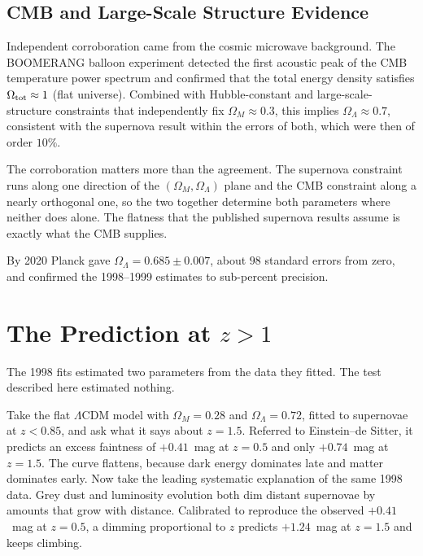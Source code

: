 \documentclass[12pt]{article}
\begin{document}
\subsection{CMB and Large-Scale Structure Evidence}

Independent corroboration came from the cosmic microwave background.
The BOOMERANG balloon experiment \citeyearpar{Boomerang2000} detected
the first acoustic peak of the CMB temperature power spectrum and
confirmed that the total energy density satisfies $\Omega_{\rm tot}
\approx 1$ (flat universe).  Combined with Hubble-constant and
large-scale-structure constraints that independently fix $\Omega_M \approx
0.3$, this implies $\Omega_\Lambda \approx 0.7$, consistent with the supernova
result within the errors of both, which were then of order $10\%$.

The corroboration matters more than the agreement.  The supernova constraint
runs along one direction of the $(\Omega_M,\Omega_\Lambda)$ plane and the CMB
constraint along a nearly orthogonal one, so the two together determine both
parameters where neither does alone.  The flatness that the published
supernova results assume is exactly what the CMB supplies.

By 2020 Planck \citep{Planck2020} gave $\Omega_\Lambda = 0.685 \pm 0.007$,
about $98$ standard errors from zero, and confirmed the 1998--1999 estimates
to sub-percent precision.

\section{The Prediction at $z > 1$}
\label{sec:prediction}

The 1998 fits estimated two parameters from the data they fitted.  The test
described here estimated nothing.

Take the flat $\Lambda$CDM model with $\Omega_M = 0.28$ and
$\Omega_\Lambda = 0.72$, fitted to supernovae at $z < 0.85$, and ask what it
says about $z = 1.5$.  Referred to Einstein--de Sitter, it predicts an excess
faintness of $+0.41$~mag at $z = 0.5$ and only $+0.74$~mag at $z = 1.5$.  The
curve flattens, because dark energy dominates late and matter dominates early.
Now take the leading systematic explanation of the same 1998 data.  Grey dust
and luminosity evolution both dim distant supernovae by amounts that grow with
distance.  Calibrated to reproduce the observed $+0.41$~mag at $z = 0.5$, a
dimming proportional to $z$ predicts $+1.24$~mag at $z = 1.5$ and keeps
climbing.
\end{document}
